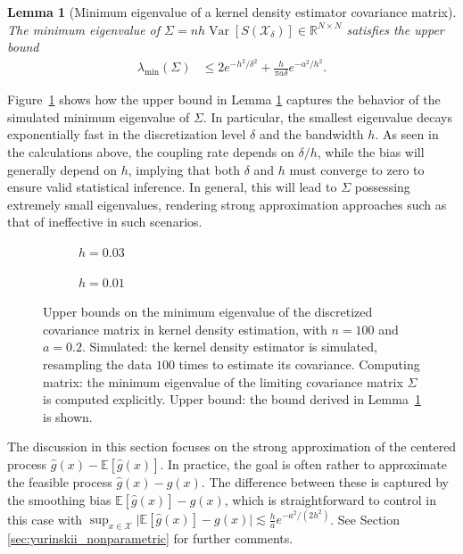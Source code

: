 \documentclass[11pt,lof]{puthesis}
\newcommand{\R}{\ensuremath{\mathbb{R}}}
\newcommand{\E}{\ensuremath{\mathbb{E}}}
\newcommand{\cX}{\ensuremath{\mathcal{X}}}
\DeclareMathOperator{\Var}{Var}
\theoremstyle{break}
\newtheorem{lemma}{Lemma}[section]
\theoremstyle{proof}
\begin{document}
\begin{lemma}[Minimum eigenvalue of a
  kernel density estimator covariance matrix]%
  \label{lem:yurinskii_kde_eigenvalue}
  The minimum eigenvalue of
  $\Sigma=n h\Var[S(\cX_\delta)] \in \R^{N \times N}$
  satisfies the upper bound
  \begin{align*}
    \lambda_{\min}(\Sigma)
    &\leq
    2 e^{-h^2/\delta^2}
    + \frac{h}{\pi a \delta}
    e^{-a^2 / h^2}.
  \end{align*}
\end{lemma}
%
Figure~\ref{fig:yurinskii_min_eig} shows how the upper bound in Lemma
\ref{lem:yurinskii_kde_eigenvalue} captures the behavior of the simulated
minimum eigenvalue of $\Sigma$. In particular, the smallest eigenvalue decays
exponentially fast in the discretization level $\delta$ and the bandwidth $h$.
As seen in the calculations above, the coupling rate depends on $\delta / h$,
while the bias will generally depend on $h$, implying that both $\delta$ and
$h$ must converge to zero to ensure valid statistical inference. In general,
this will lead to $\Sigma$ possessing extremely small eigenvalues, rendering
strong approximation approaches such as that of \citet{li2020uniform}
ineffective in such scenarios.
%
\begin{figure}[t]
  \centering
  \begin{subfigure}{0.49\textwidth}
    \centering
    \caption{$h = 0.03$}
  \end{subfigure}
  \begin{subfigure}{0.49\textwidth}
    \centering
    \caption{$h = 0.01$}
  \end{subfigure}
  \caption[Minimum eigenvalue of the kernel density covariance matrix]{
    Upper bounds on the minimum eigenvalue of the discretized covariance
    matrix in kernel density estimation,
    with $n=100$ and $a = 0.2$.
    Simulated: the kernel density estimator is simulated,
    resampling the data $100$ times
    to estimate its covariance.
    Computing matrix: the minimum eigenvalue of the limiting covariance
    matrix $\Sigma$ is computed explicitly.
    Upper bound: the bound derived in
    Lemma~\ref{lem:yurinskii_kde_eigenvalue}
    is shown.
  }
  \label{fig:yurinskii_min_eig}
\end{figure}

The discussion in this section focuses on the strong approximation of the
centered process $\hat g(x)-\E [ \hat g(x) ]$. In practice, the goal is often
rather to approximate the feasible process $\hat g(x)- g(x)$. The difference
between these is captured by the smoothing bias $\E [ \hat g(x) ] - g(x)$,
which is straightforward to control in this case with
$\sup_{x \in \cX} \big| \E [ \hat g(x) ] - g(x) \big|
\lesssim \frac{h}{a} e^{-a^2 / (2 h^2)}$.
See Section \ref{sec:yurinskii_nonparametric} for further
comments.
\end{document}
